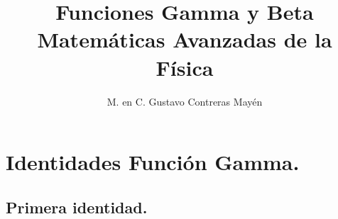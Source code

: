 
\usepackage{apacite}
\title{Funciones Gamma y Beta \\[0.3em]  \large{Matemáticas Avanzadas de la Física}\vspace{-3ex}}
\author{M. en C. Gustavo Contreras Mayén}
\date{ }

\vspace{-4cm}
\maketitle
\fontsize{14}{14}\selectfont
\tableofcontents
\newpage

\section{Identidades Función Gamma.}
\subsection{Primera identidad.}

